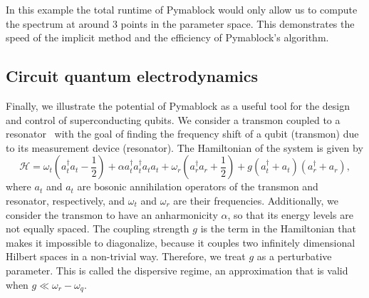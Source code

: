 In this example the total runtime of Pymablock would only allow us to compute
the spectrum at around $3$ points in the parameter space.
This demonstrates the speed of the implicit method and the efficiency of
Pymablock's algorithm.

\subsection{Circuit quantum electrodynamics}

Finally, we illustrate the potential of Pymablock as a useful tool for the
design and control of superconducting qubits.
We consider a transmon coupled to a resonator~\cite{Krantz_2019} with the goal
of finding the frequency shift of a qubit (transmon) due to its measurement
device (resonator).
The Hamiltonian of the system is given by
%
\begin{equation}
    \label{eq:H_cqed}
    \mathcal{H} =
    \omega_t (a^{\dagger}_{t} a_{t} - \frac{1}{2})
    + \alpha a^{\dagger}_{t} a^{\dagger}_{t} a_{t} a_{t} +
    \omega_r (a^{\dagger}_{r} a_{r} + \frac{1}{2}) +
    g (a^{\dagger}_{t} + a_{t}) (a^{\dagger}_{r} + a_{r}),
\end{equation}
%
where $a_t$ and $a_t$ are bosonic annihilation operators of the transmon
and resonator, respectively, and $\omega_t$ and $\omega_r$ are their
frequencies.
Additionally, we consider the transmon to have an anharmonicity $\alpha$,
so that its energy levels are not equally spaced.
The coupling strength $g$ is the term in the Hamiltonian that makes it
impossible to diagonalize, because it couples two infinitely dimensional
Hilbert spaces in a non-trivial way.
Therefore, we treat $g$ as a perturbative parameter.
This is called the dispersive regime, an approximation that is valid when
$g \ll \omega_{r} - \omega_{q}$.

